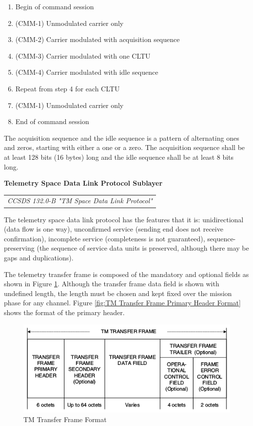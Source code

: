 \begin{enumerate}
\item Begin of command session
\item (CMM-1) Unmodulated carrier only
\item (CMM-2) Carrier modulated with acquisition sequence
\item (CMM-3) Carrier modulated with one CLTU
\item (CMM-4) Carrier modulated with idle sequence 
\item Repeat from step 4 for each CLTU
\item (CMM-1) Unmodulated carrier only
\item End of command session
\end{enumerate}

The acquisition sequence and the idle sequence is a pattern of alternating ones and zeros, starting with either a one or a zero. The acquisition sequence shall be at least 128 bits (16 bytes) long and the idle sequence shall be at least 8 bits long.

\textbf{Telemetry Space Data Link Protocol Sublayer}

\begin{tabular}{l}
\textit{CCSDS 132.0-B "TM Space Data Link Protocol" \cite{CCSDS 132.0-B}} 
\end{tabular}

The telemetry space data link protocol has the features that it is: unidirectional (data flow is one way), unconfirmed service (sending end does not receive confirmation), incomplete service (completeness is not guaranteed), sequence-preserving (the sequence of service data units is preserved, although there may be gaps and duplications).

The telemetry transfer frame is composed of the mandatory and optional fields as shown in Figure \ref{fig:TM Transfer Frame Format}. Although the transfer frame data field is shown with undefined length, the length must be chosen and kept fixed over the mission phase for any channel. Figure \ref{fig:TM Transfer Frame Primary Header Format} shows the format of the primary header.

\begin{figure}[h]
\centering\includegraphics[scale=0.6]{fig/tm_transfer_frame_format}
\caption{TM Transfer Frame Format}
\label{fig:TM Transfer Frame Format}
\end{figure}

